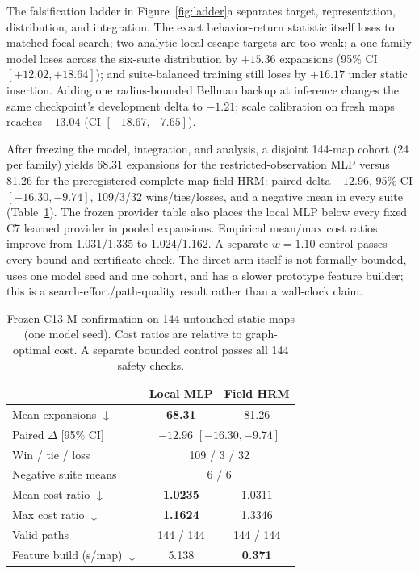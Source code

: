 \documentclass[letterpaper]{article} %
\newcommand{\stage}[1]{\textsc{#1}}
\begin{document}
The falsification ladder in Figure~\ref{fig:ladder}a separates target, representation, distribution, and integration. The exact behavior-return statistic itself loses to matched focal search; two analytic local-escape targets are too weak; a one-family model loses across the six-suite distribution by $+15.36$ expansions (95\% CI $[+12.02,+18.64]$); and suite-balanced training still loses by $+16.17$ under static insertion. Adding one radius-bounded Bellman backup at inference changes the same checkpoint's development delta to $-1.21$; scale calibration on fresh maps reaches $-13.04$ (CI $[-18.67,-7.65]$).

After freezing the model, integration, and analysis, a disjoint 144-map cohort (24 per family) yields 68.31 expansions for the restricted-observation MLP versus 81.26 for the preregistered complete-map field HRM: paired delta $-12.96$, 95\% CI $[-16.30,-9.74]$, 109/3/32 wins/ties/losses, and a negative mean in every suite (Table~\ref{tab:c13m}). The frozen provider table also places the local MLP below every fixed \stage{C7} learned provider in pooled expansions. Empirical mean/max cost ratios improve from 1.031/1.335 to 1.024/1.162. A separate $w=1.10$ control passes every bound and certificate check. The direct arm itself is not formally bounded, uses one model seed and one cohort, and has a slower prototype feature builder; this is a search-effort/path-quality result rather than a wall-clock claim.

\begin{table}[t]
\centering
\small
\begin{tabular}{lcc}
\toprule
 & Local MLP & Field HRM \\
\midrule
Mean expansions $\downarrow$ & \textbf{68.31} & 81.26 \\
Paired $\Delta$ [95\% CI] & \multicolumn{2}{c}{$-12.96$ $[-16.30,-9.74]$} \\
Win / tie / loss & \multicolumn{2}{c}{109 / 3 / 32} \\
Negative suite means & \multicolumn{2}{c}{6 / 6} \\
Mean cost ratio $\downarrow$ & \textbf{1.0235} & 1.0311 \\
Max cost ratio $\downarrow$ & \textbf{1.1624} & 1.3346 \\
Valid paths & 144 / 144 & 144 / 144 \\
Feature build (s/map) $\downarrow$ & 5.138 & \textbf{0.371} \\
\bottomrule
\end{tabular}
\caption{Frozen \stage{C13-M} confirmation on 144 untouched static maps (one model seed). Cost ratios are relative to graph-optimal cost. A separate bounded control passes all 144 safety checks.}
\label{tab:c13m}
\end{table}
\end{document}
